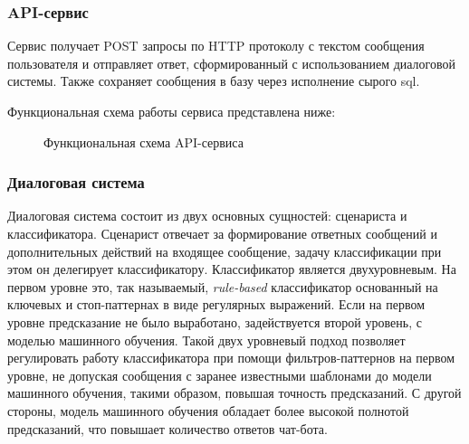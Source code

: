     \subsubsection*{API-сервис}
    Сервис получает POST запросы по HTTP протоколу с текстом сообщения пользователя и отправляет ответ,
    сформированный с использованием диалоговой системы. Также сохраняет сообщения в базу через исполнение сырого sql.

    Функциональная схема работы сервиса представлена ниже:
    \begin{figure}[!h]
        \centering
        \caption{Функциональная схема API-сервиса}
        \label{fig:func-schema-api11-before}
    \end{figure}

    \subsubsection*{Диалоговая система}
    Диалоговая система состоит из двух основных сущностей: сценариста и классификатора. Сценарист отвечает за формирование ответных
    сообщений и дополнительных действий на входящее сообщение, задачу классификации при этом он делегирует классификатору.
    Классификатор является двухуровневым. На первом уровне это, так называемый, \textit{rule-based} классификатор
    основанный на ключевых и стоп-паттернах в виде регулярных выражений. Если на первом уровне предсказание не было выработано,
    задействуется второй уровень, с моделью машинного обучения. Такой двух уровневый подход позволяет
    регулировать работу классификатора при помощи фильтров-паттернов на первом уровне, не допуская сообщения с
    заранее известными шаблонами до модели машинного обучения, такими образом, повышая точность предсказаний.
    С другой стороны, модель машинного обучения обладает более высокой полнотой предсказаний, что повышает
    количество ответов чат-бота.

